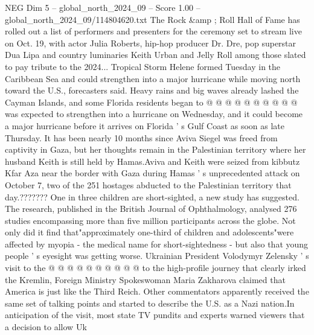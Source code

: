\begin{textsample}{NEG Dim 5 – global\_north\_2024\_09 – Score 1.00 – global\_north\_2024\_09/114804620.txt}
The Rock \&amp ; Roll Hall of Fame has rolled out a list of performers and presenters for the ceremony set to stream live on Oct. 19, with actor Julia Roberts, hip-hop producer Dr.
Dre, pop superstar Dua Lipa and country luminaries Keith Urban and Jelly Roll among those slated to pay tribute to the 2024...
Tropical Storm Helene formed Tuesday in the Caribbean Sea and could strengthen into a major hurricane while moving north toward the U.S., forecasters said.
Heavy rains and big waves already lashed the Cayman Islands, and some Florida residents began to @ @ @ @ @ @ @ @ @ @ was expected to strengthen into a hurricane on Wednesday, and it could become a major hurricane before it arrives on Florida ' s Gulf Coast as soon as late Thursday.
It has been nearly 10 months since Aviva Siegel was freed from captivity in Gaza, but her thoughts remain in the Palestinian territory where her husband Keith is still held by Hamas.Aviva and Keith were seized from kibbutz Kfar Aza near the border with Gaza during Hamas ' s unprecedented attack on October 7, two of the 251 hostages abducted to the Palestinian territory that day.???????
One in three children are short-sighted, a new study has suggested.
The research, published in the British Journal of Ophthalmology, analysed 276 studies encompassing more than five million participants across the globe.
Not only did it find that"approximately one-third of children and adolescents"were affected by myopia - the medical name for short-sightedness - but also that young people ' s eyesight was getting worse.
Ukrainian President Volodymyr Zelensky ' s visit to the @ @ @ @ @ @ @ @ @ @ to the high-profile journey that clearly irked the Kremlin, Foreign Ministry Spokeswoman Maria Zakharova claimed that America is just like the Third Reich.
Other commentators apparently received the same set of talking points and started to describe the U.S. as a Nazi nation.In anticipation of the visit, most state TV pundits and experts warned viewers that a decision to allow Uk

\end{textsample}
